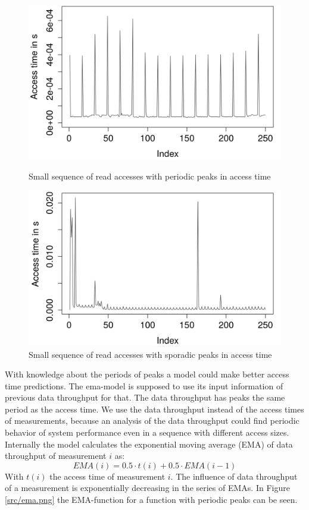 \documentclass{superfri}
\begin{document}
	\begin{figure}[!h]
		\centering
		\begin{minipage}[b]{0.47\textwidth}
			\includegraphics[width=\textwidth]{src/periodic_peaks.png}
			\caption{Small sequence of read accesses with periodic peaks in access time}
			\label{periodic}
		\end{minipage}
		\hfill
		\begin{minipage}[b]{0.47\textwidth}
			\includegraphics[width=\textwidth]{src/sporadic_peaks.png}
			\caption{Small sequence of read accesses with sporadic peaks in access time}
			\label{sporadic}
		\end{minipage}
	\end{figure}
	
	With knowledge about the periods of peaks a model could make better access time predictions.
	The ema-model is supposed to use its input information of previous data throughput for that.
	The data throughput has peaks the same period as the access time. We use the data throughput instead of the access times of measurements, because an analysis of the data throughput could find periodic behavior of system performance even in a sequence with different access sizes. 
	Internally the model calculates the exponential moving average (EMA) of data throughput of measurement $i$ as:
	\begin{equation}
	EMA(i) = 0.5 \cdot t(i)+ 0.5 \cdot EMA(i-1)
	\end{equation}
	With $t(i)$ the access time of measurement $i$.
	The influence of data throughput of a measurement is exponentially decreasing in the series of EMAs.
	In Figure \ref{src/ema.png} the EMA-function for a function with periodic peaks can be seen.
	
\end{document}

